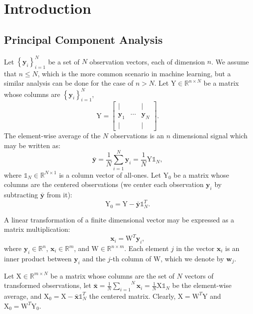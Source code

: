 \documentclass[journal]{IEEEtran}
\begin{document}
\section{Introduction}
\subsection{Principal Component Analysis}
Let $\left\{ \textbf{y}_i \right\}_{i=1}^N$ be a set of $N$ observation vectors, each of dimension $n$. We assume that $n \leq N$, which is the more common scenario in machine learning, but a similar analysis can be done for the case of $n > N$. Let $\text{Y} \in \mathbb{R}^{n \times N}$ be a matrix whose columns are $\left\{ \textbf{y}_i \right\}_{i=1}^N$,
\[
\text{Y} = \left[\begin{array}{ccc}
\mid &  & \mid\\
\textbf{y}_{1} & \cdots & \textbf{y}_{N}\\
\mid &  & \mid
\end{array}\right].
\]
The element-wise average of the $N$ observations is an $n$ dimensional signal which may be written as:
\[
\bar{\textbf{y}} = \frac{1}{N}\overset{N}{\underset{i=1}{\sum}} \textbf{y}_i = \frac{1}{N} \text{Y} \mathbb{1}_N,
\]
where $\mathbb{1}_N \in \mathbb{R}^{N \times 1}$ is a column vector of all-ones. Let $\text{Y}_0$ be a matrix whose columns are the centered observations (we center each observation $\textbf{y}_i$ by subtracting $\bar{\textbf{y}}$ from it): 
\[
\text{Y}_0 = \text{Y} - \bar{\textbf{y}} \mathbb{1}_N^T.
\]

A linear transformation of a finite dimensional vector may be expressed as a matrix multiplication:
\[
\textbf{x}_i = \text{W}^T\textbf{y}_i,
\]
where $\textbf{y}_i \in \mathbb{R}^n$, $\textbf{x}_i \in \mathbb{R}^m$, and $\text{W} \in \mathbb{R}^{n \times m}$.
Each element $j$ in the vector $\textbf{x}_i$ is an inner product between $\textbf{y}_i$ and the $j$-th column of $\text{W}$, which we denote by $\textbf{w}_j$.

Let $\text{X} \in \mathbb{R}^{m \times N}$ be a matrix whose columns are the set of $N$ vectors of transformed observations, let $\bar{\textbf{x}} = \frac{1}{N}\overset{N}{\underset{i=1}{\sum}} \textbf{x}_i = \frac{1}{N} \text{X} \mathbb{1}_N$ be the element-wise average, and $\text{X}_0 = \text{X} - \bar{\textbf{x}} \mathbb{1}_N^T$ the centered matrix. Clearly, $\text{X} = \text{W}^T \text{Y}$ and $\text{X}_0 = \text{W}^T \text{Y}_0$. 
\end{document}
